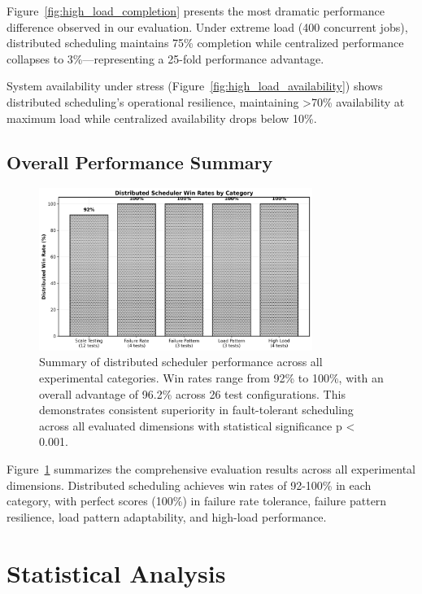 \documentclass[conference]{IEEEtran}
\begin{document}
Figure~\ref{fig:high_load_completion} presents the most dramatic performance difference observed in our evaluation. Under extreme load (400 concurrent jobs), distributed scheduling maintains 75\% completion while centralized performance collapses to 3\%—representing a 25-fold performance advantage.

System availability under stress (Figure~\ref{fig:high_load_availability}) shows distributed scheduling's operational resilience, maintaining >70\% availability at maximum load while centralized availability drops below 10\%.

\subsection{Overall Performance Summary}

\begin{figure}[!t]
\centering
\includegraphics[width=3.5in]{figure11_win_rates.png}
\caption{Summary of distributed scheduler performance across all experimental categories. Win rates range from 92\% to 100\%, with an overall advantage of 96.2\% across 26 test configurations. This demonstrates consistent superiority in fault-tolerant scheduling across all evaluated dimensions with statistical significance p < 0.001.}
\label{fig:win_rates}
\end{figure}

Figure~\ref{fig:win_rates} summarizes the comprehensive evaluation results across all experimental dimensions. Distributed scheduling achieves win rates of 92-100\% in each category, with perfect scores (100\%) in failure rate tolerance, failure pattern resilience, load pattern adaptability, and high-load performance.

\section{Statistical Analysis}
\end{document}
